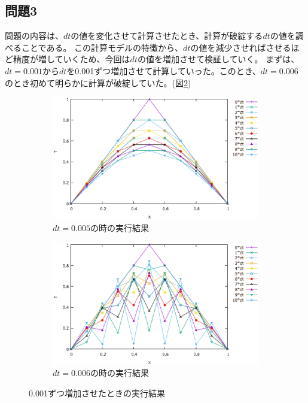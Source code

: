 \documentclass{jsarticle}
\begin{document}
\subsection{問題3}
問題の内容は、$dt$の値を変化させて計算させたとき、計算が破綻する$dt$の値を調べることである。
この計算モデルの特徴から、$dt$の値を減少させればさせるほど精度が増していくため、今回は$dt$の値を増加させて検証していく。
まずは、$dt=0.001$から$dt$を0.001ずつ増加させて計算していった。このとき、$dt=0.006$のとき初めて明らかに計算が破綻していた。(図\ref{fig05})
\begin{figure}[H]
	\centering
	\begin{subfigure}{0.9\columnwidth}
		\centering
		\includegraphics[width=\columnwidth]{pic04.eps}
		\caption{$dt=0.005$の時の実行結果}
		\label{fig04}
	\end{subfigure}
	\begin{subfigure}{0.9\columnwidth}
		\centering
		\includegraphics[width=\columnwidth]{pic05.eps}
		\caption{$dt=0.006$の時の実行結果}
		\label{fig05}
	\end{subfigure}
	\label{fignone01}
	\caption{0.001ずつ増加させたときの実行結果}
\end{figure}
\end{document}

